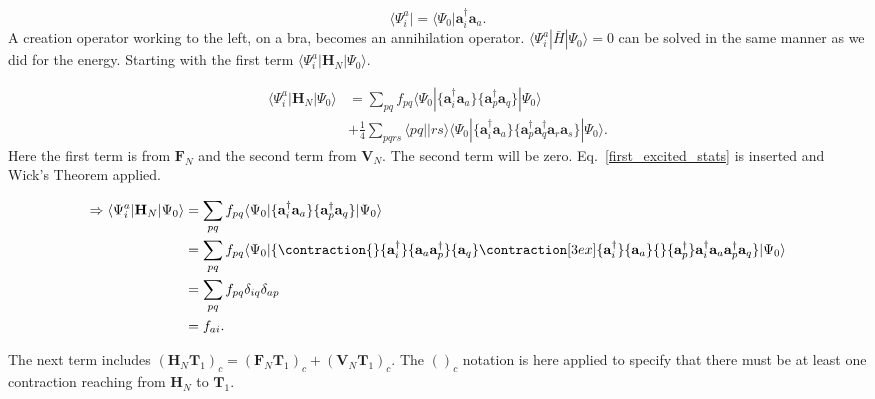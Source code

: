 \documentclass[graybox,sectrefs,envcountresetchap,open=right]{svmonodo}
\begin{document}
\begin{equation}
\langle \Psi_i^a | = \langle \Psi_0 | \mathbf{a}^{\dagger}_i \mathbf{a}_a . \label{first_excited_stats}
\end{equation} 
A creation operator working to the left, on a bra, becomes an annihilation operator. $\langle \Psi_i^a | \bar{H} | \Psi_0 \rangle = 0$ can be solved in the same manner as we did for the energy. Starting with the first term $\langle \Psi_i^a | \mathbf{H}_N | \Psi_0 \rangle$.


\begin{align}
\langle \Psi_i^a | \mathbf{H}_N | \Psi_0 \rangle & = 
\sum_{pq} f_{pq} \langle \Psi_0| \{ \mathbf{a}^{\dagger}_i \mathbf{a}_a \} \{ \mathbf{a}^{\dagger}_p \mathbf{a}_q \} | \Psi_0 \rangle \nonumber \\ &
+ \frac{1}{4} \sum_{pqrs} \langle pq||rs \rangle  \langle \Psi_0| \{ \mathbf{a}^{\dagger}_i \mathbf{a}_a \} \{ \mathbf{a}^{\dagger}_p \mathbf{a}^{\dagger}_q \mathbf{a}_r \mathbf{a}_s \} | \Psi_0 \rangle .
\end{align} 
Here the first term is from $\mathbf{F}_N$ and the second term from $\mathbf{V}_N$. The second term will be zero. Eq.~\ref{first_excited_stats} is inserted and Wick's Theorem applied.

\begin{align}
\Rightarrow \langle \Psi_i^a | \mathbf{H}_N | \Psi_0 \rangle & = \sum_{pq} f_{pq} \langle \Psi_0| \{ \mathbf{a}^{\dagger}_i \mathbf{a}_a \} \{ \mathbf{a}^{\dagger}_p \mathbf{a}_q \} | \Psi_0 \rangle \nonumber \\ &
= \sum_{pq} f_{pq} \langle \Psi_0| \{
\contraction{}{\mathbf{a}^{\dagger}_i}{\mathbf{a}_a \mathbf{a}^{\dagger}_p}{\mathbf{a}_q}
\contraction[3ex]{\mathbf{a}^{\dagger}_i}{\mathbf{a}_a}{}{\mathbf{a}^{\dagger}_p}
\mathbf{a}^{\dagger}_i \mathbf{a}_a \mathbf{a}^{\dagger}_p \mathbf{a}_q 
 \} | \Psi_0 \rangle \nonumber \\ &
= \sum_{pq} f_{pq} \delta_{iq} \delta_{ap} \nonumber \\ &
= f_{ai} . \label{t1amp_1}
\end{align} 


The next term includes $(\mathbf{H}_N \mathbf{T}_1)_c = (\mathbf{F}_N \mathbf{T}_1)_c + (\mathbf{V}_N \mathbf{T}_1)_c$. The $()_c$ notation is here applied to specify that there must be at least one contraction reaching from $\mathbf{H}_N$ to $\mathbf{T}_1$.
\end{document}
